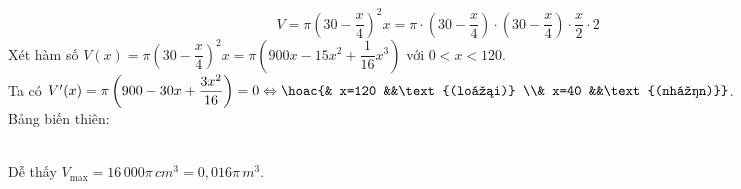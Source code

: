 \begin{ex}
{\begin{itemchoice}
         $$V=\pi \left(30-\dfrac{x}{4}\right)^2x=\pi \cdot \left(30-\dfrac{x}{4}\right)\cdot \left(30-\dfrac{x}{4}\right)\cdot \dfrac{x}{2}\cdot 2$$
         Xét hàm số $V(x)=\pi \left(30-\dfrac{x}{4}\right)^2x=\pi \left(900x-15x^2+\dfrac{1}{16}x^3\right)$  với $0<x<120$.\\
         Ta có $V'(x)=\pi \left(900-30x+\dfrac{3x^2}{16}\right)=0 \Leftrightarrow \hoac{& x=120 &&\text{(loại)} \\& x=40 &&\text{(nhận)}}$.\\
         Bảng biến thiên:\\
         \\
         Dễ thấy $V_{\max}=16\,000\pi \,cm^3=0{,}016\pi \,m^3$.
     \end{itemchoice}
 }
\end{ex}
